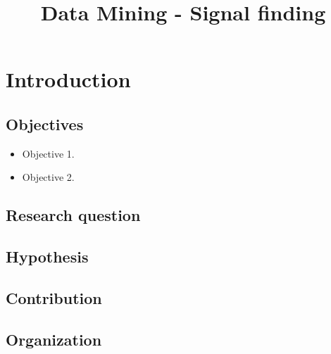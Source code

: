 \documentclass[conference]{IEEEtran}
\begin{document}
 
\title{Data Mining - Signal finding}

\author{

}

\maketitle


\begin{abstract}
\end{abstract}


\IEEEpeerreviewmaketitle


\section{Introduction}

\subsection{Objectives}

\begin{itemize}
	\item Objective 1.
	\item Objective 2.
\end{itemize}
 
\subsection{Research question}
\label{sec:researchQuestions}


\subsection{Hypothesis}
\label{sec:hypothesis}


\subsection{Contribution}


\subsection{Organization}
\end{document}
